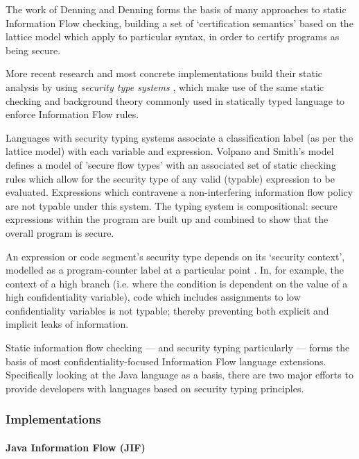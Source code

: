 The work of Denning and Denning \cite{denning1977if} forms the basis of many approaches to static Information Flow checking, building a set of `certification semantics' based on the lattice model which apply to particular syntax, in order to certify programs as being secure.

More recent research and most concrete implementations build their static analysis by using \textit{security type systems} \cite{sabelfeld2003if}, which make use of the same static checking and background theory commonly used in statically typed language to enforce Information Flow rules.

Languages with security typing systems associate a classification label (as per the lattice model) with each variable and expression. Volpano and Smith's model \cite{volpano1996sectype} defines a model of 'secure flow types' with an associated set of static checking rules which allow for the security type of any valid (typable) expression to be evaluated. Expressions which contravene a non-interfering information flow policy are not typable under this system. The typing system is compositional: secure expressions within the program are built up and combined to show that the overall program is secure.

An expression or code segment's security type depends on its `security context', modelled as a program-counter label at a particular point \cite{sabelfeld2003if}. In, for example, the context of a high branch (i.e. where the condition is dependent on the value of a high confidentiality variable), code which includes assignments to low confidentiality variables is not typable; thereby preventing both explicit and implicit leaks of information.

Static information flow checking --- and security typing particularly --- forms the basis of most confidentiality-focused Information Flow language extensions. Specifically looking at the Java language as a basis, there are two major efforts to provide developers with languages based on security typing principles.

\subsubsection{Implementations}

\paragraph{Java Information Flow (JIF)}

